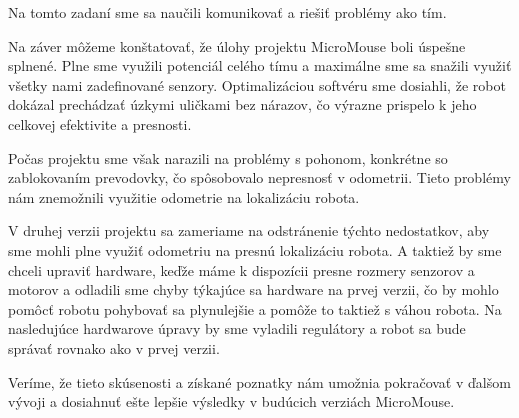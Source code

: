 Na tomto zadaní sme sa naučili komunikovať a riešiť problémy ako tím. 

Na záver môžeme konštatovať, že úlohy projektu MicroMouse boli úspešne splnené. Plne sme využili potenciál celého tímu a maximálne sme sa snažili využiť všetky nami zadefinované senzory. Optimalizáciou softvéru sme dosiahli, že robot dokázal prechádzať úzkymi uličkami bez nárazov, čo výrazne prispelo k jeho celkovej efektivite a presnosti.

Počas projektu sme však narazili na problémy s pohonom, konkrétne so zablokovaním prevodovky, čo spôsobovalo nepresnosť v odometrii. Tieto problémy nám znemožnili využitie odometrie na lokalizáciu robota. 

V druhej verzii projektu sa zameriame na odstránenie týchto nedostatkov, aby sme mohli plne využiť odometriu na presnú lokalizáciu robota. A taktiež by sme chceli upraviť hardware, keďže máme k dispozícii presne rozmery senzorov a motorov a odladili sme chyby týkajúce sa hardware na prvej verzii, čo by mohlo pomôcť robotu pohybovať sa plynulejšie a pomôže to taktiež s váhou robota. Na nasledujúce hardwarove úpravy by sme vyladili regulátory a robot sa bude správať rovnako ako v prvej verzii. 

Veríme, že tieto skúsenosti a získané poznatky nám umožnia pokračovať v ďalšom vývoji a dosiahnuť ešte lepšie výsledky v budúcich verziách MicroMouse.